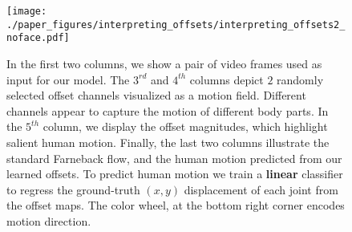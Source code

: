 \documentclass{article}
\begin{document}
\begin{figure}
\begin{center}
   \texttt{[image: ./paper\_figures/interpreting\_offsets/interpreting\_offsets2\_noface.pdf]}
\end{center}
\vspace{-0.1cm}
\caption{In the first two columns, we show a pair of video frames used as input for our model. The $3^{rd}$ and $4^{th}$ columns depict $2$ randomly selected offset channels visualized as a motion field. Different channels appear to capture the motion of different body parts. In the $5^{th}$ column, we display the offset magnitudes, which highlight salient human motion. Finally, the last two columns illustrate the standard Farneback flow, and the human motion predicted from our learned offsets. To predict human motion we train a \textbf{linear} classifier to regress the ground-truth $(x,y)$ displacement of each joint from the offset maps. The color wheel, at the bottom right corner encodes motion direction.\vspace{-0.1cm}}
\label{offsets_fig}
\end{figure}































\small





\end{document}
